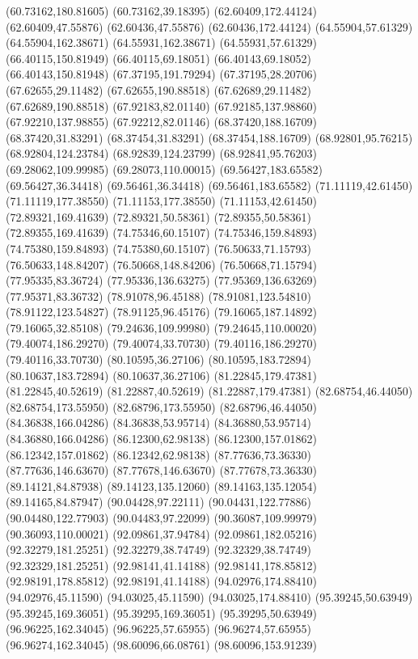 {(60.73162,180.81605) (60.73162,39.18395) (62.60409,172.44124) (62.60409,47.55876) (62.60436,47.55876) (62.60436,172.44124) (64.55904,57.61329) (64.55904,162.38671)
(64.55931,162.38671) (64.55931,57.61329) (66.40115,150.81949) (66.40115,69.18051) (66.40143,69.18052) (66.40143,150.81948) (67.37195,191.79294) (67.37195,28.20706)
(67.62655,29.11482) (67.62655,190.88518) (67.62689,29.11482) (67.62689,190.88518) (67.92183,82.01140) (67.92185,137.98860) (67.92210,137.98855) (67.92212,82.01146)
(68.37420,188.16709) (68.37420,31.83291) (68.37454,31.83291) (68.37454,188.16709) (68.92801,95.76215) (68.92804,124.23784) (68.92839,124.23799) (68.92841,95.76203)
(69.28062,109.99985) (69.28073,110.00015) (69.56427,183.65582) (69.56427,36.34418) (69.56461,36.34418) (69.56461,183.65582) (71.11119,42.61450) (71.11119,177.38550)
(71.11153,177.38550) (71.11153,42.61450) (72.89321,169.41639) (72.89321,50.58361) (72.89355,50.58361) (72.89355,169.41639) (74.75346,60.15107) (74.75346,159.84893)
(74.75380,159.84893) (74.75380,60.15107) (76.50633,71.15793) (76.50633,148.84207) (76.50668,148.84206) (76.50668,71.15794) (77.95335,83.36724) (77.95336,136.63275)
(77.95369,136.63269) (77.95371,83.36732) (78.91078,96.45188) (78.91081,123.54810) (78.91122,123.54827) (78.91125,96.45176) (79.16065,187.14892) (79.16065,32.85108)
(79.24636,109.99980) (79.24645,110.00020) (79.40074,186.29270) (79.40074,33.70730) (79.40116,186.29270) (79.40116,33.70730) (80.10595,36.27106) (80.10595,183.72894)
(80.10637,183.72894) (80.10637,36.27106) (81.22845,179.47381) (81.22845,40.52619) (81.22887,40.52619) (81.22887,179.47381) (82.68754,46.44050) (82.68754,173.55950)
(82.68796,173.55950) (82.68796,46.44050) (84.36838,166.04286) (84.36838,53.95714) (84.36880,53.95714) (84.36880,166.04286) (86.12300,62.98138) (86.12300,157.01862)
(86.12342,157.01862) (86.12342,62.98138) (87.77636,73.36330) (87.77636,146.63670) (87.77678,146.63670) (87.77678,73.36330) (89.14121,84.87938) (89.14123,135.12060)
(89.14163,135.12054) (89.14165,84.87947) (90.04428,97.22111) (90.04431,122.77886) (90.04480,122.77903) (90.04483,97.22099) (90.36087,109.99979) (90.36093,110.00021)
(92.09861,37.94784) (92.09861,182.05216) (92.32279,181.25251) (92.32279,38.74749) (92.32329,38.74749) (92.32329,181.25251) (92.98141,41.14188) (92.98141,178.85812)
(92.98191,178.85812) (92.98191,41.14188) (94.02976,174.88410) (94.02976,45.11590) (94.03025,45.11590) (94.03025,174.88410) (95.39245,50.63949) (95.39245,169.36051)
(95.39295,169.36051) (95.39295,50.63949) (96.96225,162.34045) (96.96225,57.65955) (96.96274,57.65955) (96.96274,162.34045) (98.60096,66.08761) (98.60096,153.91239)
}
